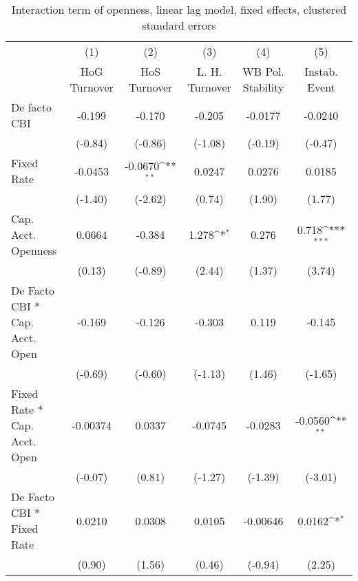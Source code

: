{
\def\sym#1{\ifmmode^{#1}\else\(^{#1}\)\fi}
\begin{longtable}{l*{5}{c}}
\caption{Interaction term of openness, linear lag model, fixed effects, clustered standard errors \label{kapintlagsDF}}\\
\hline\hline\endfirsthead\hline\endhead\hline\endfoot\endlastfoot
                &\multicolumn{1}{c}{(1)}&\multicolumn{1}{c}{(2)}&\multicolumn{1}{c}{(3)}&\multicolumn{1}{c}{(4)}&\multicolumn{1}{c}{(5)}\\
                &\multicolumn{1}{c}{HoG Turnover}&\multicolumn{1}{c}{HoS Turnover}&\multicolumn{1}{c}{L. H. Turnover}&\multicolumn{1}{c}{WB Pol. Stability}&\multicolumn{1}{c}{Instab. Event}\\
\hline
De facto CBI    &   -0.199         &   -0.170         &   -0.205         &  -0.0177         &  -0.0240         \\
                &  (-0.84)         &  (-0.86)         &  (-1.08)         &  (-0.19)         &  (-0.47)         \\
[1em]
Fixed Rate      &  -0.0453         &  -0.0670\sym{**} &   0.0247         &   0.0276         &   0.0185         \\
                &  (-1.40)         &  (-2.62)         &   (0.74)         &   (1.90)         &   (1.77)         \\
[1em]
Cap. Acct. Openness&   0.0664         &   -0.384         &    1.278\sym{*}  &    0.276         &    0.718\sym{***}\\
                &   (0.13)         &  (-0.89)         &   (2.44)         &   (1.37)         &   (3.74)         \\
[1em]
De Facto CBI * Cap. Acct. Open&   -0.169         &   -0.126         &   -0.303         &    0.119         &   -0.145         \\
                &  (-0.69)         &  (-0.60)         &  (-1.13)         &   (1.46)         &  (-1.65)         \\
[1em]
Fixed Rate * Cap. Acct. Open& -0.00374         &   0.0337         &  -0.0745         &  -0.0283         &  -0.0560\sym{**} \\
                &  (-0.07)         &   (0.81)         &  (-1.27)         &  (-1.39)         &  (-3.01)         \\
[1em]
De Facto CBI * Fixed Rate&   0.0210         &   0.0308         &   0.0105         & -0.00646         &   0.0162\sym{*}  \\
                &   (0.90)         &   (1.56)         &   (0.46)         &  (-0.94)         &   (2.25)         \\

\end{longtable}}

